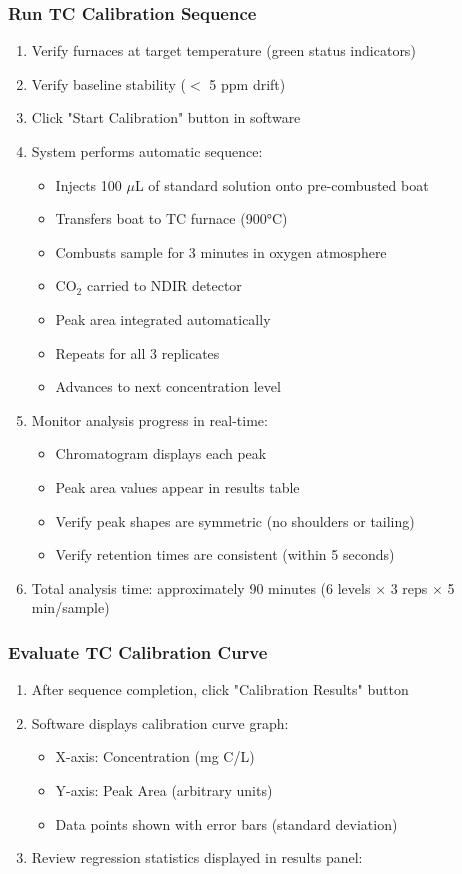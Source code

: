 \documentclass[11pt,a4paper]{article}\usepackage[]{graphicx}\usepackage[]{xcolor}
\begin{document}
\subsubsection{Run TC Calibration Sequence}
\begin{enumerate}[noitemsep]
    \item Verify furnaces at target temperature (green status indicators)
    \item Verify baseline stability ($<$ 5 ppm drift)
    \item Click "Start Calibration" button in software
    \item System performs automatic sequence:
    \begin{itemize}
        \item Injects 100 $\mu$L of standard solution onto pre-combusted boat
        \item Transfers boat to TC furnace (900°C)
        \item Combusts sample for 3 minutes in oxygen atmosphere
        \item CO$_2$ carried to NDIR detector
        \item Peak area integrated automatically
        \item Repeats for all 3 replicates
        \item Advances to next concentration level
    \end{itemize}
    \item Monitor analysis progress in real-time:
    \begin{itemize}
        \item Chromatogram displays each peak
        \item Peak area values appear in results table
        \item Verify peak shapes are symmetric (no shoulders or tailing)
        \item Verify retention times are consistent (within 5 seconds)
    \end{itemize}
    \item Total analysis time: approximately 90 minutes (6 levels $\times$ 3 reps $\times$ 5 min/sample)
\end{enumerate}

\subsubsection{Evaluate TC Calibration Curve}
\begin{enumerate}[noitemsep]
    \item After sequence completion, click "Calibration Results" button
    \item Software displays calibration curve graph:
    \begin{itemize}
        \item X-axis: Concentration (mg C/L)
        \item Y-axis: Peak Area (arbitrary units)
        \item Data points shown with error bars (standard deviation)
    \end{itemize}
    \item Review regression statistics displayed in results panel:
\end{enumerate}
\end{document}
